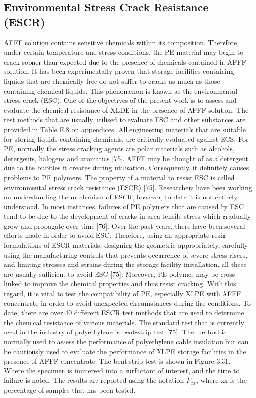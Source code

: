 \documentclass[12pt]{report}
\begin{document}
\subsection{Environmental Stress Crack Resistance (ESCR)}
AFFF solution contains sensitive chemicals within its composition. Therefore, under certain temperature and stress conditions, the PE material may begin to crack sooner than expected due to the presence of chemicals contained in AFFF solution. It has been experimentally proven that storage facilities containing liquids that are chemically free do not suffer to cracks as much as those containing chemical liquids. This phenomenon is known as the environmental stress crack (ESC). One of the objectives of the present work is to assess and evaluate the chemical resistance of XLDE in the presence of AFFF solution. The test methods that are usually utilised to evaluate ESC and other substances are provided in Table E.8 on appendices. 
All engineering materials that are suitable for storing liquids containing chemicals, are critically evaluated against ECS. For PE, normally the stress cracking agents are polar materials such as alcohols, detergents, halogens and aromatics [75]. AFFF may be thought of as a detergent due to the bubbles it creates during utilisation. Consequently, it definitely causes problems to PE polymers. The property of a material to resist ESC is called environmental stress crack resistance (ESCR) [75]. Researchers have been working on understanding the mechanism of ESCR, however, to date it is not entirely understood. In most instances, failures of PE polymers that are caused by ESC tend to be due to the development of cracks in area tensile stress which gradually grow and propagate over time [76]. 
Over the past years, there have been several efforts made in order to avoid ESC. Therefore, using an appropriate resin formulations of ESCR materials, designing the geometric appropriately, carefully using the manufacturing controls that prevents occurrence of severe stress risers, and limiting stresses and strains during the storage facility installation, all these are usually sufficient to avoid ESC [75]. Moreover, PE polymer may be cross-linked to improve the chemical properties and thus resist cracking.  With this regard, it is vital to test the compatibility of PE, especially XLPE with AFFF concentrate in order to avoid unexpected circumstances during fire conditions. To date, there are over 40 different ESCR test methods that are used to determine the chemical resistance of various materials. The standard test that is currently used in the industry of polyethylene is bent-strip test [75]. The method is normally used to assess the performance of polyethylene cable insulation but can be cautiously used to evaluate the performance of XLPE storage facilities in the presence of AFFF concentrate. The bent-strip test is shown in Figure 3.31. Where the specimen is immersed into a surfactant of interest, and the time to failure is noted. The results are reported using the notation $F_{xx}$, where xx is the percentage of samples that has been tested.
 
\end{document}
